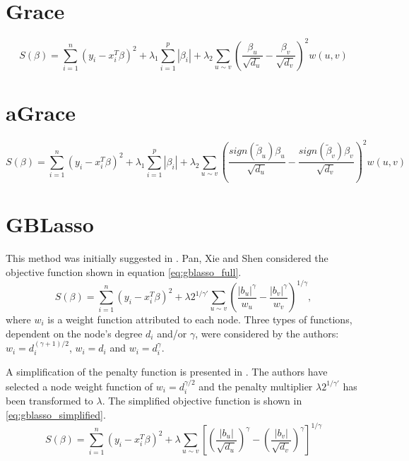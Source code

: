\section{Grace}
\begin{equation}
S(\beta) = \sum_{i=1}^{n} (y_i - x_i^T\beta)^2 + \lambda_1\sum_{i=1}^{p}\left|\beta_i\right| + \lambda_2\sum_{u \sim v}\left(\frac{\beta_u}{\sqrt{d_u}}-\frac{\beta_v}{\sqrt{d_v}}\right)^2w(u,v)
\end{equation}


\section{aGrace}
\begin{equation}
S(\beta) = \sum_{i=1}^{n} (y_i - x_i^T\beta)^2 + \lambda_1\sum_{i=1}^{p}\left|\beta_i\right| + \lambda_2\sum_{u \sim v}\left(\frac{sign(\tilde{\beta}_u)\beta_u}{\sqrt{d_u}}-\frac{sign(\tilde{\beta}_v)\beta_v}{\sqrt{d_v}}\right)^2w(u,v)
\end{equation}


\section{GBLasso} \label{sec:gblasso}
This method was initially suggested in \cite{pan2010incorporating}. Pan, Xie and Shen considered the objective function shown in equation \ref{eq:gblasso_full}. 
\begin{equation} \label{eq:gblasso_full}
S(\beta) = \sum_{i=1}^{n} (y_i - x_i^T\beta)^2 + \lambda2^{1/\gamma'}\sum_{u \sim v}\left(\frac{|b_u|^\gamma}{w_u}-\frac{|b_v|^\gamma}{w_v}\right)^{1/\gamma},
\end{equation}
where $w_i$ is a weight function attributed to each node. Three types of functions, dependent on the node's degree $d_i$ and/or $\gamma$, were considered by the authors: $w_i = d_i^{(\gamma+1)/2}$, $w_i = d_i$ and $w_i = d_i^\gamma$.

A simplification of the penalty function is presented in \cite{kim2013network}. The authors have selected a node weight function of $w_i = d_i^{\gamma/2}$ and the penalty multiplier $\lambda2^{1/\gamma'}$ has been transformed to $\lambda$. The simplified objective function is shown in \ref{eq:gblasso_simplified}.
\begin{equation} \label{eq:gblasso_simplified}
S(\beta) = \sum_{i=1}^{n} (y_i - x_i^T\beta)^2 + 
\lambda\sum_{u \sim v}
\left[\left(\frac{|b_u|}{\sqrt{d_u}}\right)^\gamma-
\left(\frac{|b_v|}{\sqrt{d_v}}\right)^\gamma\right]^{1/\gamma}
\end{equation}



